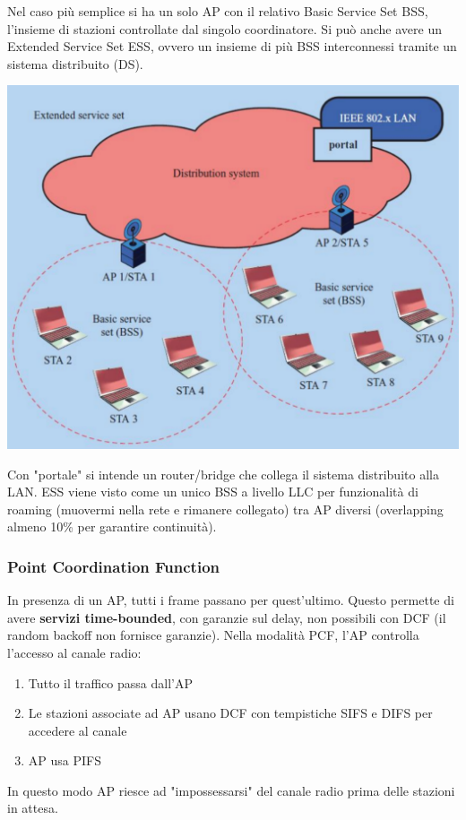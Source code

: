 Nel caso più semplice si ha un solo AP con il relativo Basic Service Set BSS, l'insieme di stazioni controllate dal singolo coordinatore. Si può anche avere un Extended Service Set ESS, ovvero un insieme di più BSS interconnessi tramite un sistema distribuito (DS).
\begin{center}
	\includegraphics[width=0.8\linewidth]{img/wlan/ess}
\end{center}

Con "portale" si intende un router/bridge che collega il sistema distribuito alla LAN. ESS viene visto come un unico BSS a livello LLC per funzionalità di roaming (muovermi nella rete e rimanere collegato) tra AP diversi (overlapping almeno 10\% per garantire continuità).

\subsubsection{Point Coordination Function}

In presenza di un AP, tutti i frame passano per quest'ultimo. Questo permette di avere \textbf{servizi time-bounded}, con garanzie sul delay, non possibili con DCF (il random backoff non fornisce garanzie). Nella modalità PCF, l'AP controlla l'accesso al canale radio: 
\begin{enumerate}
	\item Tutto il traffico passa dall'AP
    
	\item Le stazioni associate ad AP usano DCF con tempistiche SIFS e DIFS per accedere al canale

	\item AP usa PIFS
\end{enumerate}
In questo modo AP riesce ad "impossessarsi" del canale radio prima delle stazioni in attesa.

